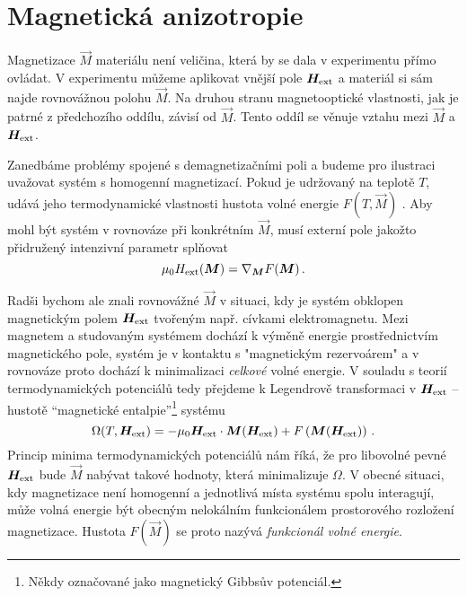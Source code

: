 \section{Magnetická anizotropie}
\label{chap:magneticka-anizotropie}

Magnetizace $\vec{M}$ materiálu není veličina, která by se dala v experimentu přímo ovládat.
V experimentu můžeme aplikovat vnější pole $\bm{H}_\textrm{ext}$ a materiál si sám najde rovnovážnou polohu $\vec{M}$.
Na druhou stranu magnetooptické vlastnosti, jak je patrné z předchozího oddílu, závisí od $\vec{M}$.
Tento oddíl se věnuje vztahu mezi $\vec{M}$ a $\bm{H}_\textrm{ext}$.

Zanedbáme problémy spojené s demagnetizačními poli a budeme pro ilustraci uvažovat systém s homogenní magnetizací.
Pokud je udržovaný na teplotě $T$, udává jeho termodynamické vlastnosti hustota volné energie $F(T,\vec{M})$ \cite{callenThermodynamicsIntroductionThermostatistics1985}.
Aby mohl být systém v rovnováze při konkrétním $\vec{M}$, musí externí pole jakožto přidružený intenzivní parametr splňovat
\begin{equation} 
\label{eqn:Hext=gradF}
    \mu_0H_\textrm{ext}(\bm{M}) = \nabla_{\bm{M}} F(\bm{M}) \,.
\end{equation}

Radši bychom ale znali rovnovážné $\vec{M}$ v situaci, kdy je systém obklopen magnetickým polem $\bm{H}_\textrm{ext}$ tvořeným např. cívkami elektromagnetu.
Mezi magnetem a studovaným systémem dochází k výměně energie prostřednictvím magnetického pole, systém je v kontaktu s "magnetickým rezervoárem" a v rovnováze proto dochází k minimalizaci \emph{celkové} volné energie.
V souladu s teorií termodynamických potenciálů tedy přejdeme k Legendrově transformaci v $\bm{H}_\textrm{ext}$ -- hustotě ``magnetické entalpie''\footnote{Někdy označované jako magnetický Gibbsův potenciál.} systému\cite{castellanoThermodynamicPotentialsSimple2003}
\begin{equation} 
\label{eqn:magneticka-entalpie}
    \Omega(T,\bm{H}_\textrm{ext})= -\mu_0\bm{H}_\textrm{ext}\cdot\bm{M}(\bm{H}_\textrm{ext})+F\left(\bm{M}(\bm{H}_\textrm{ext})\right) \,.
\end{equation}
Princip minima termodynamických potenciálů nám říká, že pro libovolné pevné $\bm{H}_\textrm{ext}$ bude $\vec{M}$ nabývat takové hodnoty, která minimalizuje $\Omega$.
V obecné situaci, kdy magnetizace není homogenní a jednotlivá místa systému spolu interagují, může volná energie být obecným nelokálním funkcionálem prostorového rozložení magnetizace.
Hustota $F(\vec{M})$ se proto nazývá \emph{funkcionál volné energie}.


